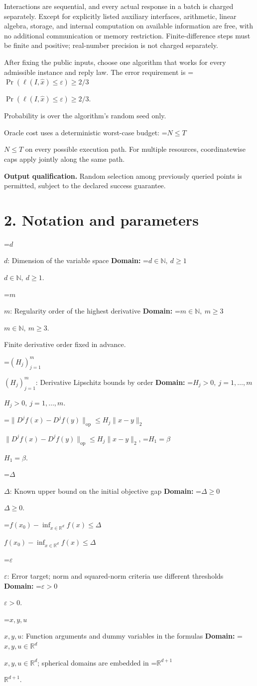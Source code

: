 \documentclass[10pt,a4paper]{article}
\newcommand{\AtlasMath}[1]{\par\begingroup\centering\setbox0=\hbox{$\displaystyle #1$}\ifdim\wd0>1.4\linewidth\typeout{ATLAS WIDE FORMULA: \the\wd0}\fi\ifdim\wd0>\linewidth\resizebox{\linewidth}{!}{\box0}\else\box0\fi\par\endgroup}
\newcommand{\AtlasInlineMath}[1]{\begingroup\setbox0=\hbox{$#1$}\ifdim\wd0>.4\linewidth\endgroup\AtlasMath{#1}\else\endgroup$#1$\fi}
\begin{document}
Interactions are sequential, and every actual response in a batch is charged separately. Except for explicitly listed auxiliary interfaces, arithmetic, linear algebra, storage, and internal computation on available information are free, with no additional communication or memory restriction. Finite-difference steps must be finite and positive; real-number precision is not charged separately.

After fixing the public inputs, choose one algorithm that works for every admissible instance and reply law. The error requirement is \AtlasInlineMath{\Pr(\ell(I,\widehat{x})\le \varepsilon)\ge2/3}.

Probability is over the algorithm's random seed only.

Oracle cost uses a deterministic worst-case budget: \AtlasInlineMath{N\le T} on every possible execution path. For multiple resources, coordinatewise caps apply jointly along the same path.

\textbf{Output qualification.} Random selection among previously queried points is permitted, subject to the declared success guarantee.

\section{2. Notation and parameters}
\AtlasInlineMath{d}: Dimension of the variable space \textbf{Domain:} \AtlasInlineMath{d\in\mathbb{N},\ d\ge1}.

\AtlasInlineMath{m}: Regularity order of the highest derivative \textbf{Domain:} \AtlasInlineMath{m\in\mathbb{N},\ m\ge3}.

Finite derivative order fixed in advance.

\AtlasInlineMath{(H_j)_{j=1}^m}: Derivative Lipschitz bounds by order \textbf{Domain:} \AtlasInlineMath{H_j>0,\ j=1,\ldots,m}.

\AtlasInlineMath{\|D^jf(x)-D^jf(y)\|_{\mathrm{op}}\le H_j\|x-y\|_2}, \AtlasInlineMath{H_1=\beta}.

\AtlasInlineMath{\Delta}: Known upper bound on the initial objective gap \textbf{Domain:} \AtlasInlineMath{\Delta\ge0}.

\AtlasInlineMath{f(x_0)-\inf_{x\in\mathbb{R}^d}f(x)\le\Delta}

\AtlasInlineMath{\varepsilon}: Error target; norm and squared-norm criteria use different thresholds \textbf{Domain:} \AtlasInlineMath{\varepsilon>0}.

\AtlasInlineMath{x,y,u}: Function arguments and dummy variables in the formulas \textbf{Domain:} \AtlasInlineMath{x,y,u\in\mathbb{R}^d}; spherical domains are embedded in \AtlasInlineMath{\mathbb{R}^{d+1}}.
\end{document}
